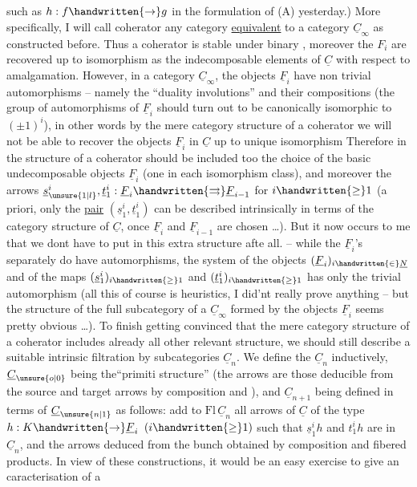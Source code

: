 
such as $h:f\handwritten{\to}g$ in the formulation of (A) yesterday.) More specifically, I will call coherator any category \uline{equivalent} to a category $\underline{C}_{\infty}$ as constructed before.  Thus a coherator is stable under binary , moreover the $F_i$ are recovered up to isomorphism as the indecomposable elements of $\underline{C}$ with respect to amalgamation.
However, in a category $\underline{C}_{\infty}$, the objects $\underline{F}_i$ have non trivial automorphisms -- namely the ``duality involutions'' and their compositions (the group of automorphisms of $\underline{F}_i$ should turn out to be canonically isomorphic to $(\pm1)^i$), in  other words by the mere category structure of a coherator we will not be able to recover the objects $\underline{F}_i$ in $\underline{C}$ up to unique isomorphism Therefore in the structure of a coherator should be included too the choice of the basic undecomposable objects $\underline{F}_i$ (one in each isomorphism class), and moreover the arrows $\underline{s}_{\unsure{1|l}}^i,\underline{t}_1^i:\underline{F}_i\handwritten{\rightrightarrows}\underline{F}_{i-1}$ for $i\handwritten{\geq}1$ (a priori, only the \uline{pair} $(\underline{s}_1^i,\underline{t}_1^i)$ can be described intrinsically in terms of the category structure of $\underline{C}$, once $\underline{F}_i$ and $\underline{F}_{i-1}$ are chosen \ldots). But it now occurs to me that we dont have to put in this extra structure afte all. -- while the $\underline{F}_i$'s separately do have automorphisms, the system of the objects $(\underline{F}_i)_{i\handwritten{\in}\underline{N}}$ and of the maps $(\underline{s}_1^i)_{i\handwritten{\geq}1}$ and $(\underline{t}_1^i)_{i\handwritten{\geq}1}$ has only the trivial automorphism (all this of course is heuristics, I did'nt really prove anything -- but the structure of the full subcategory of a $\underline{C}_{\infty}$ formed by the objects $\underline{F}_i$ seems pretty obvious \ldots). To finish getting convinced that the mere category structure of a coherator includes already all other relevant structure, we should still describe a suitable intrinsic filtration by subcategories $\underline{C}_n$. We define the $\underline{C}_n$ inductively, $\underline{C}_{\unsure{o|0}}$ being the``primiti structure'' (the arrows are those deducible from the source and target arrows by composition and ), and $\underline{C}_{n+1}$ being defined in terms of $\underline{C}_{\unsure{n|1}}$ as follows: add to $\mathrm{Fl}\,\underline{C}_n$ all arrows of $\underline{C}$ of the type $h:K\handwritten{\to}\underline{F}_i$ $(i\handwritten{\geq}1)$ such that $\underline{s}_1^i h$ and $t_1^i h$ are in $\underline{C}_n$, and the arrows deduced from the bunch obtained  by composition and fibered products. In view of these constructions, it would be an easy exercise to give an  caracterisation of a 